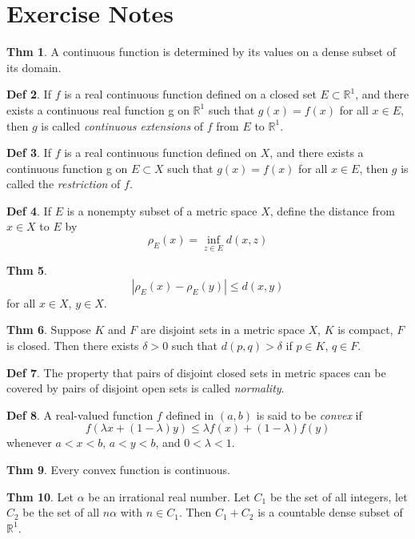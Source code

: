\documentclass{article}
\theoremstyle{definition}
\newtheorem{definition}{Def}
\newtheorem{theorem}[definition]{Thm}
\begin{document}
\section{Exercise Notes}
\begin{theorem}
    A continuous function is determined by its values on a dense subset of its domain.
\end{theorem}
\begin{definition}
    If $f$ is a real continuous function defined on a closed set $E\subset \mathbb{R}^1$, and there exists a continuous real function g on $\mathbb{R}^1$ such that $g(x)=f(x)$ for all $x\in E$, then $g$ is called \textit{continuous extensions} of $f$ from $E$ to $\mathbb{R}^1$.
\end{definition}
\begin{definition}
    If $f$ is a real continuous function defined on $X$, and there exists a continuous function g on $E\subset X$ such that $g(x)=f(x)$ for all $x\in E$, then $g$ is called the \textit{restriction} of $f$.
\end{definition}
\begin{definition}
    If $E$ is a nonempty subset of a metric space $X$, define the distance from $x\in X$ to $E$ by
    \[
    \rho_E(x)=\inf_{z\in E}d(x,z)
    \]
\end{definition}
\begin{theorem}
    \leavevmode\\
    \[
    |\rho_E(x)-\rho_E(y)|\leq d(x,y)
    \]
    for all $x\in X$, $y \in X$.
\end{theorem}
\begin{theorem}
    Suppose $K$ and $F$ are disjoint sets in a metric space $X$, $K$ is compact, $F$ is closed. Then there exists $\delta>0$ such that $d(p,q)>\delta$ if $p\in K$, $q\in F$.
\end{theorem}
\begin{definition}
    The property that pairs of disjoint closed sets in metric spaces can be covered by pairs of disjoint open sets is called \textit{normality}.
\end{definition}
\begin{definition}
    A real-valued function $f$ defined in $(a,b)$ is said to be \textit{convex} if
    \[
    f(\lambda x+(1-\lambda)y)\leq \lambda f(x)+(1-\lambda)f(y)
    \]
    whenever $a<x<b$, $a<y<b$, and $0<\lambda<1$.
\end{definition}
\begin{theorem}
    Every convex function is continuous.
\end{theorem}
\begin{theorem}
    Let $\alpha$ be an irrational real number. Let $C_1$ be the set of all integers, let $C_2$ be the set of all $n\alpha$ with $n\in C_1$. Then $C_1+C_2$ is a countable dense subset of $\mathbb{R}^1$.
\end{theorem}
\end{document}
